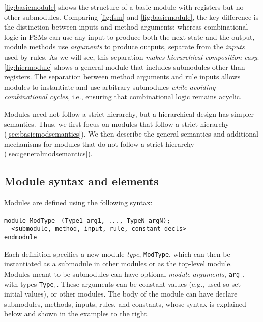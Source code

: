 \autoref{fig:basicmodule} shows the structure of a basic module with registers but no other submodules.
Comparing \autoref{fig:fsm} and \autoref{fig:basicmodule}, the key difference
is the distinction between inputs and method arguments: whereas combinational logic in FSMs
can use any input to produce both the next state and the output,
module methods use \emph{arguments} to produce outputs, separate from the \emph{inputs} used by rules.
As we will see, this separation \emph{makes hierarchical composition easy}:
\autoref{fig:hiermodule} shows a general module that includes submodules other than registers.
The separation between method arguments and rule inputs allows modules to instantiate and use
arbitrary submodules \emph{while avoiding combinational cycles}, i.e., ensuring that combinational logic
remains acyclic.

Modules need not follow a strict hierarchy, but a hierarchical design has simpler semantics.
Thus, we first focus on modules that follow a strict hierarchy (\autoref{sec:basicmodsemantics}). %
We then describe the general semantics and additional mechanisms for modules that do not follow a strict hierarchy (\autoref{sec:generalmodsemantics}).

\subsection{Module syntax and elements}
\label{sec:modulesyntax}
\label{sec:submodules}

Modules are defined using the following syntax:
\begin{center}
\verb|module ModType | \optStart \verb|(Type1 arg1, ..., TypeN argN)|\optEnd\verb|;    | \\
\verb|  <submodule, method, input, rule, constant decls> | \\
\verb|endmodule                                          |
\end{center}
Each definition specifies a new module \emph{type}, \verb|ModType|,
which can then be instantiated as a submodule in other modules
or as the top-level module.
Modules meant to be submodules can have optional \emph{module arguments},
\verb|arg|$_{\texttt{i}}$, with types \verb|Type|$_{\texttt{i}}$.
These arguments can be constant values (e.g., used so set initial values),
or other modules.
The body of the module can have declare submodules, methods, inputs, rules, and constants,
whose syntax is explained below and shown in the examples to the right.

